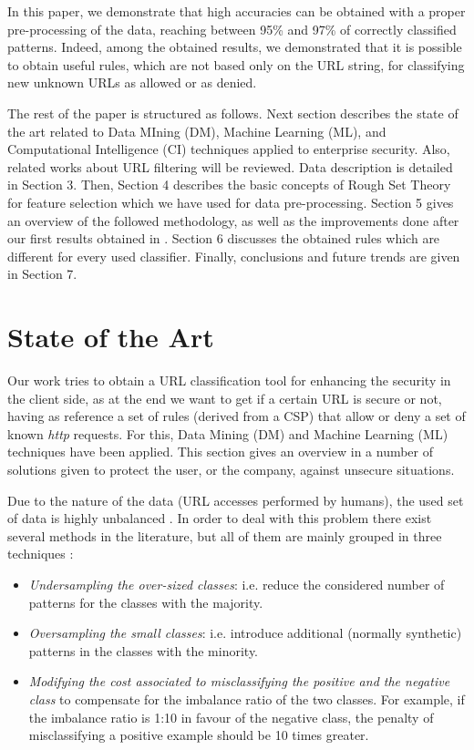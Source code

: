 \documentclass{llncs}
\begin{document}
In this paper, we demonstrate that high accuracies can be obtained with a proper pre-processing of the data, reaching between 95\% and 97\% of correctly classified patterns. Indeed, among the obtained results, we demonstrated that it is possible to obtain useful rules, which are not based only on the URL string, for classifying new unknown URLs as allowed or as denied.


The rest of the paper is structured as follows. Next section describes the state of the art related to Data MIning (DM), Machine Learning (ML), and Computational Intelligence (CI) techniques applied to enterprise security. Also, related works about URL filtering will be reviewed. Data description is detailed in Section 3. Then, Section 4 describes the basic concepts of Rough Set Theory for feature selection which we have used for data pre-processing. Section 5 gives an overview of the followed methodology, as well as the improvements done after our first results obtained in \cite{ECTA}. Section 6 discusses the obtained rules which are different for every used classifier. Finally, conclusions and future trends are given in Section 7. 

%
\section{State of the Art}
\label{sec:stateofart}

\noindent Our work tries to obtain a URL classification tool for enhancing the security in the client side, as at the end we want to get if a certain URL is secure or not, having as reference a set of rules (derived from a CSP) that allow or deny a set of known \textit{http} requests. For this, Data Mining (DM) and Machine Learning (ML) techniques have been applied. This section gives an overview in a number of solutions given to protect the user, or the company, against unsecure situations.

Due to the nature of the data (URL accesses performed by humans), the used set of data is highly unbalanced \cite{imbalanced_data_05}. In order to deal with this problem there exist several methods in the
literature, but all of them are mainly grouped in three techniques
\cite{imbalance_techniques_02}: 

\begin{itemize}
\item \textit{Undersampling the over-sized classes}: i.e. reduce the considered number of patterns for the classes with the majority.
\item \textit{Oversampling the small classes}: i.e. introduce additional (normally synthetic) patterns in the classes with the minority.
\item \textit{Modifying the cost associated to misclassifying the positive and the negative class} to compensate for the imbalance ratio of the two classes. For example, if the imbalance ratio is 1:10 in favour of the negative class, the penalty of misclassifying a positive example should be 10 times greater.
\end{itemize}
\end{document}
